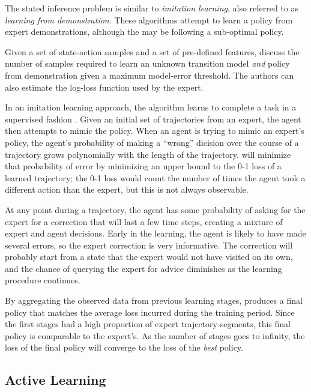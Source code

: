     The stated inference problem is similar to \emph{imitation learning}, also referred to as \textit{learning from
    demonstration}. These algorithms attempt to learn a policy from expert demonstrations, although the
     may be following a sub-optimal policy.

    Given a set of state-action samples and a set of pre-defined features, \cite{Hanawal2017LearningPolicies} discuss
    the number of samples required to learn an unknown transition model \emph{and} policy from demonstration given a
    maximum model-error threshold. The authors can also estimate the log-loss function used by the expert.

    In an imitation learning approach, the \DAGGER algorithm learns to complete a task in a supervised fashion
    \cite{ross2011reduction}. Given an initial set of trajectories from an expert, the agent then attempts to mimic the
    policy. When an agent is trying to mimic an expert's policy, the agent's probability of making a ``wrong'' dicision
    over the course of a trajectory grows polynomially with the length of the trajectory. \DAGGER will minimize that
    probability of error by minimizing an upper bound to the 0-1 loss of a learned trajectory; the 0-1 loss would count
    the number of times the agent took a different action than the expert, but this is not always observable.

    At any point during a trajectory, the agent has some probability of asking for the expert for a correction that will
    last a few time steps, creating a mixture of expert and agent decisions.  Early in the learning, the agent is likely
    to have made several errors, so the expert correction is very informative. The correction will probably start from a
    state that the expert would not have visited on its own, and the chance of querying the expert for advice diminishes
    as the learning procedure continues.

    By aggregating the observed data from previous learning stages, \DAGGER produces a final policy that matches the
    average loss incurred during the training period. Since the first stages had a high proportion of expert
    trajectory-segments, this final policy is comparable to the expert's. As the number of stages goes to infinity, the
    loss of the final policy will converge to the loss of the \emph{best} policy.

\subsection{Active Learning}

